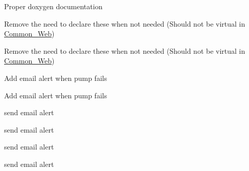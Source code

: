 
\begin{DoxyRefList}
\item[File \mbox{\hyperlink{Gbox420__Mega__Main_8ino}{Gbox420\+\_\+\+Mega\+\_\+\+Main.ino}} ]\label{todo__todo000001}%
%
Proper doxygen documentation  
\item[Member \mbox{\hyperlink{classReservoirModule__Web_a46c2f41edb89b96769bbf8f24c95b4ae}{Reservoir\+Module\+\_\+\+Web::website\+Event\+\_\+\+Button}} (\+\_\+\+\_\+attribute\+\_\+\+\_\+((unused)) char $\ast$\+Button)]\label{todo__todo000004}%
%
Remove the need to declare these when not needed (Should not be virtual in \mbox{\hyperlink{classCommon__Web}{Common\+\_\+\+Web}}) 

\label{todo__todo000009}%
%
Remove the need to declare these when not needed (Should not be virtual in \mbox{\hyperlink{classCommon__Web}{Common\+\_\+\+Web}})  
\item[Member \mbox{\hyperlink{structSettings_1_1HempyModuleSettings_a977e5f4af496e7728936bcb9f41e5b2f}{Settings::Hempy\+Module\+Settings::Time\+Out\+Pump\+\_\+\+B1}} ]\label{todo__todo000002}%
%
Add email alert when pump fails  
\item[Member \mbox{\hyperlink{structSettings_1_1HempyModuleSettings_aca9f06b3484ab74412f4999d377917fd}{Settings::Hempy\+Module\+Settings::Time\+Out\+Pump\+\_\+\+B2}} ]\label{todo__todo000003}%
%
Add email alert when pump fails  
\item[Member \mbox{\hyperlink{classWaterPump_a50e73bd11d6cbfd02a89fb958813506e}{Water\+Pump::update\+State}} (Pump\+States New\+State=(Pump\+States) -\/1)]\label{todo__todo000005}%
%
send email alert 

\label{todo__todo000006}%
%
send email alert 

\label{todo__todo000007}%
%
send email alert 

\label{todo__todo000008}%
%
send email alert 
\end{DoxyRefList}